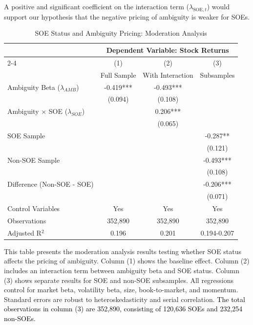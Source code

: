 \documentclass[preprint,12pt,authoryear]{elsarticle}
\begin{document}
A positive and significant coefficient on the interaction term ($\lambda_{\text{SOE},t}$) would support our hypothesis that the negative pricing of ambiguity is weaker for SOEs.

\begin{table}[htbp]
\centering
\caption{SOE Status and Ambiguity Pricing: Moderation Analysis}
\label{tab:soe_moderation}
\begin{threeparttable}
\begin{tabular*}{\textwidth}{@{\extracolsep{\fill}} lccc @{\extracolsep{\fill}}}
\toprule
& \multicolumn{3}{c}{Dependent Variable: Stock Returns} \\
\cmidrule(lr){2-4}
& (1) & (2) & (3) \\
& Full Sample & With Interaction & Subsamples \\
\midrule
\midrule
Ambiguity Beta ($\lambda_{AMB}$) & -0.419*** & -0.493*** &  \\
& (0.094) & (0.108) &  \\
\midrule
Ambiguity $\times$ SOE ($\lambda_{SOE}$) & & 0.206*** &  \\
& & (0.065) &  \\
\midrule
SOE Sample & & & -0.287** \\
& & & (0.121) \\
\midrule
Non-SOE Sample & & & -0.493*** \\
& & & (0.108) \\
\midrule
Difference (Non-SOE - SOE) & & & -0.206*** \\
& & & (0.071) \\
\midrule
Control Variables & Yes & Yes & Yes \\
\midrule
Observations & 352,890 & 352,890 & 352,890 \\
Adjusted R$^2$ & 0.196 & 0.201 & 0.194-0.207 \\
\bottomrule
\end{tabular*}
\begin{tablenotes}[flushleft]
\small
\item[] This table presents the moderation analysis results testing whether SOE status affects the pricing of ambiguity. Column (1) shows the baseline effect. Column (2) includes an interaction term between ambiguity beta and SOE status. Column (3) shows separate results for SOE and non-SOE subsamples. All regressions control for market beta, volatility beta, size, book-to-market, and momentum. Standard errors are robust to heteroskedasticity and serial correlation. \textcolor{black}{The total observations in column (3) are 352,890, consisting of 120,636 SOEs and 232,254 non-SOEs.}
\end{tablenotes}
\end{threeparttable}
\end{table}
\end{document}
